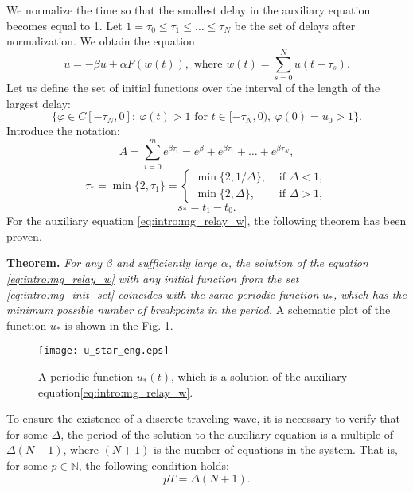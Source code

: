 We normalize the time so that the smallest delay in the auxiliary equation becomes equal to 1. Let $1 = \tau_0 \leq \tau_1 \leq \ldots \leq \tau_N$ be the set of delays after normalization. We obtain the equation
\begin{equation}
	\label{eq:intro:mg_relay_w}
	\dot{u}=-\beta u+\alpha F(w(t)), \text{ where } w(t) = \sum\limits_{s = 0}^N u(t - \tau_s).
\end{equation}
%
Let us define the set of initial functions over the interval of the length of the largest delay: 
%
\begin{equation}
	\label{eq:intro:mg_init_set}
	\{\varphi\in C[-\tau_{N},0]:\  \varphi(t)>1 \text{ for } t\in[-\tau_{N},0),\ \varphi(0)=u_0 > 1\}.
\end{equation}
%
Introduce the notation:
%
\begin{equation*}
	A = \sum_{i=0}^{m}e^{\beta \tau_{i}}=e^\beta+e^{\beta \tau_1}+\ldots+e^{\beta \tau_{N}},
\end{equation*}
\begin{equation*}
	\tau_* = \min\{2,\tau_1\}=\left\lbrace\begin{array}{cl}
		\min\{2,1/\Delta\}, & \text{ if } \Delta < 1,
		\\
		\min\{2,\Delta\}, & \text{ if } \Delta > 1,
	\end{array}\right.
\end{equation*}
\begin{equation*}
	s_* = t_1-t_0.
\end{equation*}
%
For the auxiliary equation \eqref{eq:intro:mg_relay_w}, the following theorem has been proven.

\textbf{Theorem.} \textit{For any \(\beta\) and sufficiently large \(\alpha\), the solution of the equation \eqref{eq:intro:mg_relay_w} with any initial function from the set \eqref{eq:intro:mg_init_set} coincides with the same periodic function \(u_*\), which has the minimum possible number of breakpoints in the period.}
%
A schematic plot of the function $u_*$ is shown in the Fig. \ref{fig:intro:u_star}.
%
\begin{figure}[h]
	\centering
	\texttt{[image: u\_star\_eng.eps]}
	\caption{A periodic function $u_*(t)$, which is a solution of the auxiliary equation\eqref{eq:intro:mg_relay_w}.}
	\label{fig:intro:u_star}
\end{figure}

To ensure the existence of a discrete traveling wave, it is necessary to verify that for some $\Delta$, the period of the solution to the auxiliary equation is a multiple of $\Delta (N + 1)$, where $(N + 1)$ is the number of equations in the system. That is, for some $p \in \mathbb{N}$, the following condition holds:
\begin{equation}
	\label{eq:intro:period_eq}
	pT = \Delta (N + 1).
\end{equation}

